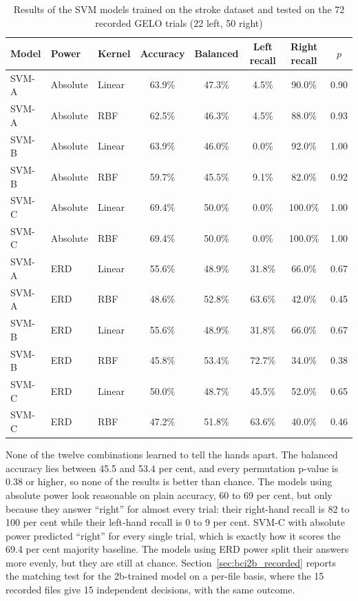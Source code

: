 \begin{table}[!ht]
\centering
\caption{Results of the SVM models trained on the stroke dataset and tested on the 72 recorded GELO trials (22 left, 50 right)}
\label{tab:svm_recorded}
\small
\setlength{\tabcolsep}{4pt}
\begin{tabular}{|l|l|l|c|c|c|c|c|}
\hline
\textbf{Model} & \textbf{Power} & \textbf{Kernel} & \textbf{Accuracy} & \textbf{Balanced} & \textbf{Left recall} & \textbf{Right recall} & \textbf{$p$} \\
\hline
SVM-A & Absolute & Linear & 63.9\% & 47.3\% & 4.5\%  & 90.0\%  & 0.90 \\
SVM-A & Absolute & RBF    & 62.5\% & 46.3\% & 4.5\%  & 88.0\%  & 0.93 \\
SVM-B & Absolute & Linear & 63.9\% & 46.0\% & 0.0\%  & 92.0\%  & 1.00 \\
SVM-B & Absolute & RBF    & 59.7\% & 45.5\% & 9.1\%  & 82.0\%  & 0.92 \\
SVM-C & Absolute & Linear & 69.4\% & 50.0\% & 0.0\%  & 100.0\% & 1.00 \\
SVM-C & Absolute & RBF    & 69.4\% & 50.0\% & 0.0\%  & 100.0\% & 1.00 \\
\hline
SVM-A & ERD    & Linear & 55.6\% & 48.9\% & 31.8\% & 66.0\%  & 0.67 \\
SVM-A & ERD    & RBF    & 48.6\% & 52.8\% & 63.6\% & 42.0\%  & 0.45 \\
SVM-B & ERD    & Linear & 55.6\% & 48.9\% & 31.8\% & 66.0\%  & 0.67 \\
SVM-B & ERD    & RBF    & 45.8\% & 53.4\% & 72.7\% & 34.0\%  & 0.38 \\
SVM-C & ERD    & Linear & 50.0\% & 48.7\% & 45.5\% & 52.0\%  & 0.65 \\
SVM-C & ERD    & RBF    & 47.2\% & 51.8\% & 63.6\% & 40.0\%  & 0.46 \\
\hline
\end{tabular}
\end{table}

None of the twelve combinations learned to tell the hands apart. The balanced accuracy
lies between 45.5 and 53.4 per cent, and every permutation p-value is 0.38 or higher, so
none of the results is better than chance. The models using absolute power look
reasonable on plain accuracy, 60 to 69 per cent, but only because they answer ``right''
for almost every trial: their right-hand recall is 82 to 100 per cent while their
left-hand recall is 0 to 9 per cent. SVM-C with absolute power predicted ``right'' for
every single trial, which is exactly how it scores the 69.4 per cent majority baseline.
The models using ERD power split their answers more evenly, but they are still at chance.
Section~\ref{sec:bci2b_recorded} reports the matching test for the 2b-trained model on a
per-file basis, where the 15 recorded files give 15 independent decisions, with the same
outcome.

